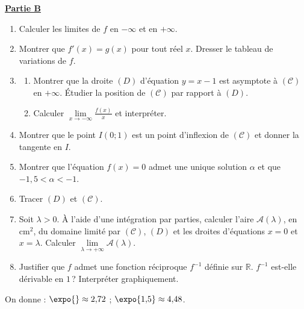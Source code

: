 \underline{\textbf{Partie B}}
\begin{enumerate}
      \item Calculer les limites de $f$ en $-\infty$ et en $+\infty$.
      \item Montrer que $f'(x) = g(x)$ pour tout r\'eel $x$. Dresser le tableau de variations de $f$.
      \item \begin{enumerate}
            \item Montrer que la droite $(D)$ d'\'equation $y = x - 1$ est asymptote \`a $(\mathscr{C})$ en $+\infty$.
                  \'Etudier la position de $(\mathscr{C})$ par rapport \`a $(D)$.
            \item Calculer $\lim\limits_{x \to -\infty} \frac{f(x)}{x}$ et interpr\'eter.
            \end{enumerate}
      \item Montrer que le point $I(0 ; 1)$ est un point d'inflexion de $(\mathscr{C})$ et donner la tangente en $I$.
      \item Montrer que l'\'equation $f(x) = 0$ admet une unique solution $\alpha$ et que $-1{,}5 < \alpha < -1$.
      \item Tracer $(D)$ et $(\mathscr{C})$.
      \item Soit $\lambda > 0$. \`A l'aide d'une int\'egration par parties, calculer l'aire $\mathscr{A}(\lambda)$, en cm$^2$,
            du domaine limit\'e par $(\mathscr{C})$, $(D)$ et les droites d'\'equations $x = 0$ et $x = \lambda$.
            Calculer $\lim\limits_{\lambda \to +\infty} \mathscr{A}(\lambda)$.
      \item Justifier que $f$ admet une fonction r\'eciproque $f^{-1}$ d\'efinie sur $\mathbb{R}$.
            $f^{-1}$ est-elle d\'erivable en $1$\,? Interpr\'eter graphiquement.
\end{enumerate}
\begin{center}
On donne : $\expo{} \approx 2{,}72$ ; $\expo{1{,}5} \approx 4{,}48$.
\end{center}

\newpage
